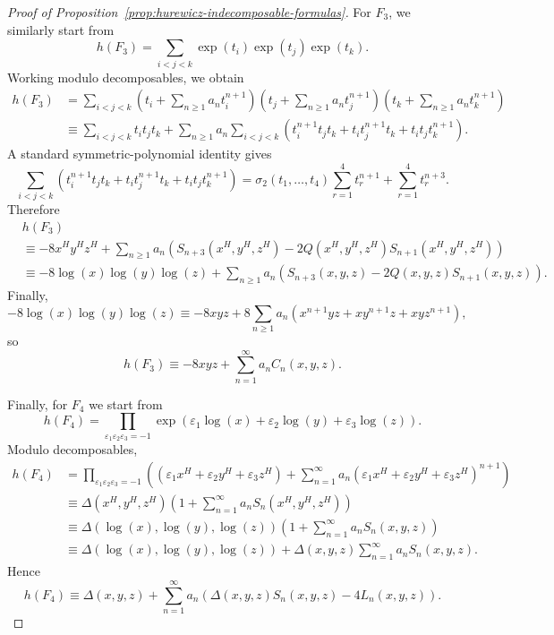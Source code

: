 \documentclass[a4paper]{amsart}
\theoremstyle{plain}
\theoremstyle{definition}
\renewcommand{\ge}{\geqslant}
\begin{document}
\begin{proof}[Proof of Proposition~\ref{prop:hurewicz-indecomposable-formulas}]
	For $F_3$, we similarly start from
	\[
		h(F_3)=\sum_{i<j<k}\exp(t_i)\exp(t_j)\exp(t_k).
	\]
	Working modulo decomposables, we obtain
	\[
		\begin{aligned}
			h(F_3)
			 & =\sum_{i<j<k}\left(t_i+\sum_{n\ge 1}a_nt_i^{n+1}\right)
			\left(t_j+\sum_{n\ge 1}a_nt_j^{n+1}\right)
			\left(t_k+\sum_{n\ge 1}a_nt_k^{n+1}\right)                 \\
			 & \equiv \sum_{i<j<k}t_it_jt_k
			+\sum_{n\ge 1}a_n\sum_{i<j<k}\left(t_i^{n+1}t_jt_k+t_it_j^{n+1}t_k+t_it_jt_k^{n+1}\right).
		\end{aligned}
	\]
	A standard symmetric-polynomial identity gives
	\[
		\sum_{i<j<k}\left(t_i^{n+1}t_jt_k+t_it_j^{n+1}t_k+t_it_jt_k^{n+1}\right)
		=
		\sigma_2(t_1,\ldots,t_4)\sum_{r=1}^4 t_r^{n+1}+\sum_{r=1}^4 t_r^{n+3}.
	\]
	Therefore
	\[
		\begin{aligned}
			 & h(F_3)                                                                                                \\
			 & \equiv -8x^{H}y^{H}z^{H}
			+\sum_{n\ge 1}a_n\left(S_{n+3}(x^{H},y^{H},z^{H})-2Q(x^{H},y^{H},z^{H})S_{n+1}(x^{H},y^{H},z^{H})\right) \\
			 & \equiv -8\log(x)\log(y)\log(z)
			+\sum_{n\ge 1}a_n\left(S_{n+3}(x,y,z)-2Q(x,y,z)S_{n+1}(x,y,z)\right).
		\end{aligned}
	\]
	Finally,
	\[
		-8\log(x)\log(y)\log(z)
		\equiv -8xyz+8\sum_{n\ge 1}a_n\left(x^{n+1}yz+xy^{n+1}z+xyz^{n+1}\right),
	\]
	so
	\[
		h(F_3)\equiv -8xyz+\sum_{n=1}^{\infty} a_n C_n(x,y,z).
	\]

	Finally, for $F_4$ we start from
	\[
		h(F_4)
		=\prod_{\varepsilon_1\varepsilon_2\varepsilon_3=-1}
		\exp \left(\varepsilon_1\log(x)+\varepsilon_2\log(y)+\varepsilon_3\log(z)\right).
	\]
	Modulo decomposables,
	\[
		\begin{aligned}
			h(F_4)
			 & =\prod_{\varepsilon_1\varepsilon_2\varepsilon_3=-1}
			\left(
			(\varepsilon_1x^H+\varepsilon_2y^H+\varepsilon_3z^H)
			+\sum_{n=1}^{\infty}a_n(\varepsilon_1x^H+\varepsilon_2y^H+\varepsilon_3z^H)^{n+1}
			\right)                                                                                  \\
			 & \equiv \Delta(x^H,y^H,z^H)\left(1+\sum_{n=1}^{\infty}a_nS_n(x^H,y^H,z^H)\right)       \\
			 & \equiv \Delta(\log(x),\log(y),\log(z))\left(1+\sum_{n=1}^{\infty}a_nS_n(x,y,z)\right) \\
			 & \equiv \Delta(\log(x),\log(y),\log(z))+\Delta(x,y,z)\sum_{n=1}^{\infty}a_nS_n(x,y,z).
		\end{aligned}
	\]
	Hence
	\[
		h(F_4)\equiv \Delta(x,y,z)+\sum_{n=1}^{\infty}a_n\left(\Delta(x,y,z)S_n(x,y,z)-4L_n(x,y,z)\right).
	\]
\end{proof}
\end{document}
